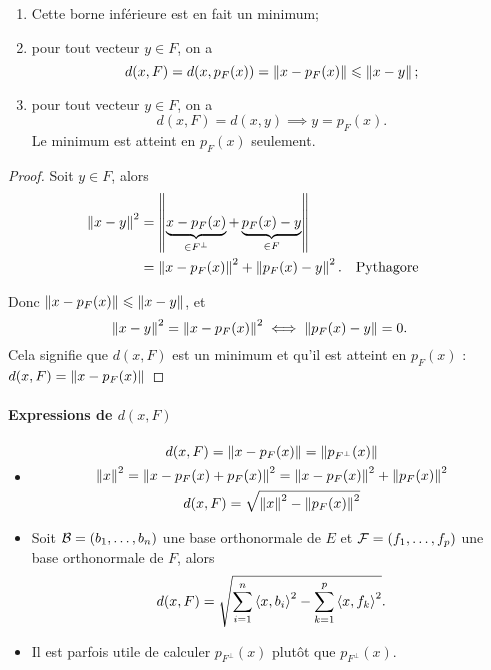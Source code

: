 \begin{theo}
  \begin{enumerate}
  \item Cette borne inférieure est en fait un minimum;
  \item pour tout vecteur $y \in F$, on a
    \begin{equation}
      d(x,F) = d(x,p_F(x)) = \left\lVert x-p_F(x)\right\rVert \leqslant \left\lVert x-y\right\rVert;    
    \end{equation}
  \item pour tout vecteur $y \in F$, on a
    \begin{equation}
      d(x,F) = d(x,y) \implies y=p_F(x).
    \end{equation}
    Le minimum est atteint en $p_F(x)$ seulement.
  \end{enumerate}
\end{theo}
\begin{proof}
  Soit $y \in F$, alors
  \begin{align}
    \left\lVert x-y\right\rVert^2 &=\left\lVert\underbrace{x-p_F(x)}_{\in F^\perp} + \underbrace{p_F(x)-y}_{\in F}\right\rVert\\
    &=\left\lVert x-p_F(x)\right\rVert^2 + \left\lVert p_F(x)-y\right\rVert^2. && \text{Pythagore}
  \end{align}
  
  Donc $\left\lVert x-p_F(x)\right\rVert \leqslant \left\lVert x-y\right\rVert$, et
  \begin{equation}
    \left\lVert x-y\right\rVert^2 = \left\lVert x-p_F(x)\right\rVert^2 \iff  \left\lVert p_F(x)-y\right\rVert=0.
  \end{equation}
  Cela signifie que $d(x,F)$ est un minimum et qu'il est atteint en $p_F(x)$ : $d(x,F)=\left\lVert x-p_F(x)\right\rVert$
\end{proof}

\paragraph{Expressions de $d(x,F)$}

\begin{itemize}
\item
  \begin{gather}
    d(x,F) = \left\lVert x-p_F(x)\right\rVert = \left\lVert p_{F^\perp}(x)\right\rVert \\
    \left\lVert x\right\rVert^2 = \left\lVert x-p_F(x)+p_F(x)\right\rVert^2=\left\lVert x-p_F(x)\right\rVert^2+\left\lVert p_F(x)\right\rVert^2\\
    d(x,F) = \sqrt{\left\lVert x\right\rVert^2-\left\lVert p_F(x)\right\rVert^2}
  \end{gather}
\item Soit $\mathcal{B}=(b_1,\ldots, b_n)$ une base orthonormale de $E$ et $\mathcal{F}=(f_1,\ldots, f_p)$ une base orthonormale de $F$, alors
  \begin{equation}
    d(x,F) = \sqrt{\sum_{i=1}^n\left\langle{x},{b_i}\right\rangle^2-\sum_{k=1}^p\left\langle{x},{f_k}\right\rangle^2}.
  \end{equation}
\item Il est parfois utile de calculer $p_{F^\perp}(x)$ plutôt que $p_{F^\perp}(x)$.
\end{itemize}

